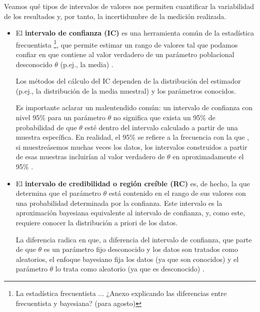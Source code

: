 
Veamos qué tipos de intervalos de valores nos permiten cuantificar la variabilidad de los resultados y, por 
tanto, la incertidumbre de la medición realizada. 

\begin{itemize}

    \item El \textbf{intervalo de confianza (IC)} es una herramienta común de la estadística 
    frecuentista
    \footnote{
        La estadística frecuentista ... ¿Anexo explicando las diferencias entre frecuentista y bayesiana?
        (para agosto)
    },
    que permite estimar un rango de valores tal que podamos confiar en que contiene al valor verdadero de 
    un parámetro poblacional desconocido $\theta$ (p.ej., la media) \cite{berrendero2025}.

    Los métodos del cálculo del IC dependen de la distribución del estimador (p.ej., la distribución de la
    media muestral) y los parámetros conocidos. 

    Es importante aclarar un malentendido común: un intervalo de confianza con nivel 95\% para un parámetro 
    $\theta$ no significa que exista un 95\% de probabilidad de que $\theta$ esté dentro del intervalo 
    calculado a partir de una muestra específica. En realidad, el 95\% se refiere a la frecuencia con la que 
    , si muestreásemos muchas veces los datos, los intervalos construidos a partir de esas muestras incluirían 
    al valor verdadero de $\theta$ en aproximadamente el 95\% \cite{murphy2022}.


    \item El \textbf{intervalo de credibilidad o región creíble (RC)} es, de hecho, la que determina que el 
    parámetro $\theta$ está contenido en el rango de sus valores con una probabilidad determinada por la 
    confianza. Este intervalo es la aproximación bayesiana equivalente al intervalo de confianza, y, como 
    este, requiere conocer la distribución a priori de los datos.

    La diferencia radica en que, a diferencia del intervalo de confianza, que parte de que $\theta$ es un 
    parámetro fijo desconocido y los datos son tratados como aleatorios, el enfoque bayesiano fija los datos
    (ya que son conocidos) y el parámetro $\theta$ lo trata como aleatorio (ya que es desconocido) 
    \cite{murphy2022}.


\end{itemize}
